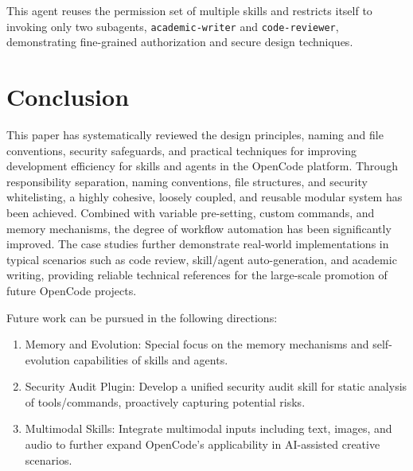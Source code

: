 \documentclass[]{article}
\newcommand{\passthrough}[1]{#1}
\newcommand{\qe}[1]{\passthrough{\lstinline!#1!}}
\newcommand{\myline}{\begin{center}\rule{0.5\linewidth}{0.5pt}\end{center}}
\begin{document}
This agent reuses the permission set of multiple skills and restricts
itself to invoking only two subagents,
\qe{academic-writer} and
\qe{code-reviewer}, demonstrating fine-grained
authorization and secure design techniques.


\section{Conclusion}\label{conclusion}

This paper has systematically reviewed the design principles, naming and
file conventions, security safeguards, and practical techniques for
improving development efficiency for skills and agents in the OpenCode
platform. Through responsibility separation, naming conventions, file
structures, and security whitelisting, a highly cohesive, loosely
coupled, and reusable modular system has been achieved. Combined with
variable pre-setting, custom commands, and memory mechanisms, the degree
of workflow automation has been significantly improved. The case studies
further demonstrate real-world implementations in typical scenarios such
as code review, skill/agent auto-generation, and academic writing,
providing reliable technical references for the large-scale promotion of
future OpenCode projects.

Future work can be pursued in the following directions: 
\begin{enumerate}
  \item Memory and Evolution: Special focus on the memory mechanisms and self-evolution
capabilities of skills and agents.
  \item Security Audit Plugin: Develop a unified security audit skill for static analysis of tools/commands,
proactively capturing potential risks.
  \item Multimodal Skills: Integrate multimodal inputs including text, images, and audio to further expand
OpenCode's applicability in AI-assisted creative scenarios.
\end{enumerate}




\end{document}
